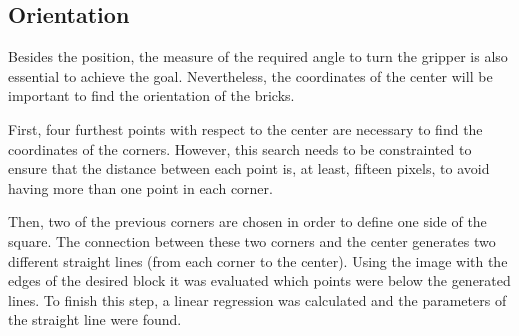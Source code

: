 \subsection*{Orientation}
Besides the position, the measure of the required angle to turn the gripper is also essential to achieve the goal. Nevertheless, the coordinates of the center will be important to find the orientation of the bricks. 

First, four furthest points with respect to the center are necessary to find the coordinates of the corners. However, this search needs to be constrainted to ensure that the distance between each point is, at least, fifteen pixels, to avoid having more than one point in each corner.

Then, two of the previous corners are chosen in order to define one side of the square. The connection between these two corners and the center generates two different straight lines (from each corner to the center). Using the image with the edges of the desired block it was evaluated which points were below the generated lines. To finish this step, a linear regression was calculated and the parameters of the straight line were found.

